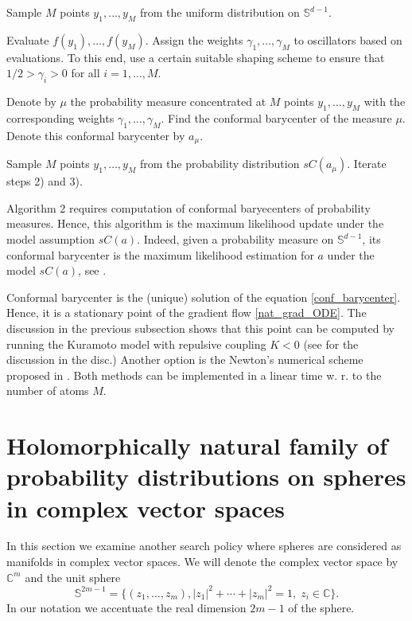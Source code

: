 \documentclass{article}
\theoremstyle{plain}%
\theoremstyle{definition}
\theoremstyle{remark}
\theoremstyle{prop}
\begin{document}
\begin{algorithm}[H]
\caption{Maximum likelihood updates under the model $sC(a)$ by computing stationary points of the IGO flow \eqref{nat_grad_ODE}}
\begin{algorithmic}[1]

\State Sample $M$ points $y_1,\dots,y_M$ from the uniform distribution on ${\mathbb S}^{d-1}$.

\State Evaluate $f(y_1),\dots,f(y_M)$. Assign the weights $\gamma_1,\dots,\gamma_M$ to oscillators based on evaluations. To this end, use a certain suitable shaping scheme to ensure that $1/2>\gamma_i>0$ for all $i=1,\dots,M$. 

\State Denote by $\mu$ the probability measure concentrated at $M$ points $y_1,\dots,y_M$ with the corresponding weights $\gamma_1,\dots,\gamma_M$. Find the conformal barycenter of the measure $\mu$. Denote this conformal barycenter by $a_\mu$.

\State Sample $M$ points $y_1,\dots,y_M$ from the probability distribution $sC(a_\mu)$. Iterate steps 2) and 3).

\end{algorithmic}
\end{algorithm}
 
Algorithm 2 requires computation of conformal baryecenters of probability measures. Hence, this algorithm is the maximum likelihood update under the model assumption $sC(a)$. Indeed, given a probability measure on $\mathbb S^{d-1}$, its conformal barycenter is the maximum likelihood estimation for $a$ under the model $sC(a)$, see \cite{CHMR}.
 
Conformal barycenter is the (unique) solution of the equation \eqref{conf_barycenter}. Hence, it is a stationary point of the gradient flow \eqref{nat_grad_ODE}. The discussion in the previous subsection shows that this point can be computed by running the Kuramoto model with repulsive coupling $K<0$ (see \cite{CEM,Jacimovic} for the discussion in the disc.) Another option is the Newton's numerical scheme proposed in \cite{CS}. Both methods can be implemented in a linear time w. r. to the number of atoms $M$. 
 
\section{Holomorphically natural family of probability distributions on spheres in complex vector spaces}

In this section we examine another search policy where spheres are considered as manifolds in complex vector spaces. We will denote the complex vector space by $\mathbb C^m$ and the unit sphere 
$$
\mathbb S^{2m-1} = \{ (z_1,\dots,z_m) , |z_1|^2 + \cdots + |z_m|^2 = 1, \; z_i \in \mathbb{C} \}.
$$
In our notation we accentuate the real dimension $2m-1$ of the sphere.
\end{document}
